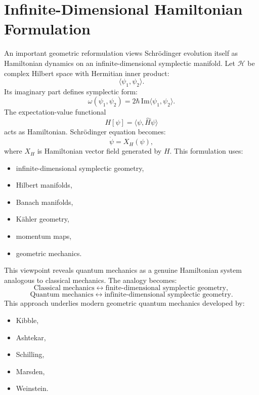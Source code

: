 \section{Infinite-Dimensional Hamiltonian Formulation}
\label{qmf:hf}
An important geometric reformulation views Schr\"odinger evolution itself
as Hamiltonian dynamics on an infinite-dimensional symplectic manifold.
Let $\mathcal H$ be complex Hilbert space with Hermitian inner product:
\[\langle \psi_1,\psi_2\rangle .\]
Its imaginary part defines symplectic form:
\[\omega(\psi_1,\psi_2)=2\hbar\,\mathrm{Im}\langle \psi_1,\psi_2\rangle .\]
The expectation-value functional
\[H[\psi]=\langle \psi,\hat H\psi\rangle\]
acts as Hamiltonian.
Schr\"odinger equation becomes:
\[\dot\psi=X_H(\psi),\]
where $X_H$ is Hamiltonian vector field generated by $H$.
This formulation uses:
\begin{itemize}
\item infinite-dimensional symplectic geometry,
\item Hilbert manifolds,
\item Banach manifolds,
\item K\"ahler geometry,
\item momentum maps,
\item geometric mechanics.
\end{itemize}
This viewpoint reveals quantum mechanics as a genuine Hamiltonian system analogous to classical mechanics.
The analogy becomes:
\[
\text{Classical mechanics}
\leftrightarrow
\text{finite-dimensional symplectic geometry},
\]
\[
\text{Quantum mechanics}
\leftrightarrow
\text{infinite-dimensional symplectic geometry}.
\]
This approach underlies modern geometric quantum mechanics developed by:
\begin{itemize}
\item Kibble,
\item Ashtekar,
\item Schilling,
\item Marsden,
\item Weinstein.
\end{itemize}

